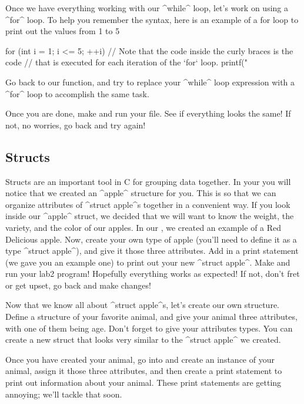 \documentclass{tufte-handout}
\begin{document}
Once we have everything working with our ^while^ loop, let's work on
using a ^for^ loop.  To help you remember the syntax, here is an example of a for loop to print out the values from 1 to 5

\begin{Code}
    for (int i = 1; i <= 5; ++i) {
        // Note that the code inside the curly braces is the code
        // that is executed for each iteration of the `for` loop.
        printf("%
    }
\end{Code}

Go back to our  function, and try to replace
your ^while^ loop expression with a ^for^ loop to accomplish the same task.

Once you are done, make and run your file.  See if everything looks the same!  If not, no worries, go back and try again!


\subsection{Structs}


Structs are an important tool in C for grouping data together.  In your
 you will notice that we created an ^apple^ structure
for you.  This is so that we can
organize attributes of ^struct apple^s together in a convenient way.  If
you look inside our ^apple^ struct, we decided that we will want to know
the weight, the variety, and the color of our apples.  In our
, we created an example of a Red Delicious apple.
Now, create your own type of apple (you'll need to define it as a type
^struct apple^), and give it those three attributes.  Add in a print
statement (we gave you an example one) to print out your new
^struct apple^.  Make and run your lab2 program!  Hopefully everything works as
expected!  If not, don't fret or get upset, go back and make changes!

Now that we know all about ^struct apple^s, let's create our own
structure. Define a structure of your favorite animal, and give your
animal three attributes, with one of them being age. Don't forget to
give your attributes types. You can create a new struct that looks very
similar to the ^struct apple^ we created.

Once you have created your animal, go into  and
create an instance of your animal, assign it those three attributes, and
then create a print statement to print out information about your
animal.  These print statements are getting annoying; we'll tackle that
soon.
\end{document}
